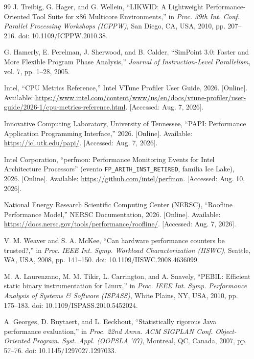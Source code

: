 \documentclass[12pt,oneside,spanish]{book}
\begin{document}
\begin{sloppypar}
\begin{thebibliography}{99}
 J. Treibig, G. Hager, and G. Wellein, ``LIKWID: A Lightweight Performance-Oriented Tool Suite for x86 Multicore Environments,'' in \textit{Proc. 39th Int. Conf. Parallel Processing Workshops (ICPPW)}, San Diego, CA, USA, 2010, pp. 207--216. doi: 10.1109/ICPPW.2010.38.

 G. Hamerly, E. Perelman, J. Sherwood, and B. Calder, ``SimPoint 3.0: Faster and More Flexible Program Phase Analysis,'' \textit{Journal of Instruction-Level Parallelism}, vol. 7, pp. 1--28, 2005.

 Intel, ``CPU Metrics Reference,'' Intel VTune Profiler User Guide, 2026. [Online]. Available: \url{https://www.intel.com/content/www/us/en/docs/vtune-profiler/user-guide/2026-1/cpu-metrics-reference.html}. [Accessed: Aug. 7, 2026].

 Innovative Computing Laboratory, University of Tennessee, ``PAPI: Performance Application Programming Interface,'' 2026. [Online]. Available: \url{https://icl.utk.edu/papi/}. [Accessed: Aug. 7, 2026].

 Intel Corporation, ``perfmon: Performance Monitoring Events for Intel Architecture Processors'' (evento \texttt{FP\_ARITH\_INST\_RETIRED}, familia Ice Lake), 2026. [Online]. Available: \url{https://github.com/intel/perfmon}. [Accessed: Aug. 10, 2026].

 National Energy Research Scientific Computing Center (NERSC), ``Roofline Performance Model,'' NERSC Documentation, 2026. [Online]. Available: \url{https://docs.nersc.gov/tools/performance/roofline/}. [Accessed: Aug. 7, 2026].

 V. M. Weaver and S. A. McKee, ``Can hardware performance counters be trusted?,'' in \textit{Proc. IEEE Int. Symp. Workload Characterization (IISWC)}, Seattle, WA, USA, 2008, pp. 141--150. doi: 10.1109/IISWC.2008.4636099.

 M. A. Laurenzano, M. M. Tikir, L. Carrington, and A. Snavely, ``PEBIL: Efficient static binary instrumentation for Linux,'' in \textit{Proc. IEEE Int. Symp. Performance Analysis of Systems \& Software (ISPASS)}, White Plains, NY, USA, 2010, pp. 175--183. doi: 10.1109/ISPASS.2010.5452024.

 A. Georges, D. Buytaert, and L. Eeckhout, ``Statistically rigorous Java performance evaluation,'' in \textit{Proc. 22nd Annu. ACM SIGPLAN Conf. Object-Oriented Program. Syst. Appl. (OOPSLA '07)}, Montreal, QC, Canada, 2007, pp. 57--76. doi: 10.1145/1297027.1297033.


\end{thebibliography}
\end{sloppypar}
\end{document}
